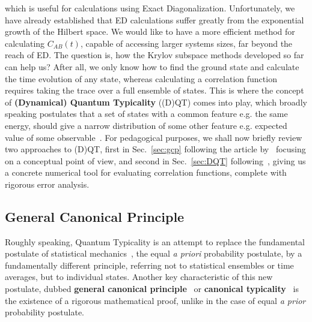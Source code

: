 which is useful for calculations using Exact Diagonalization. Unfortunately, we have already established that ED calculations
suffer greatly from the exponential growth of the Hilbert space.
We would like to have a more efficient method for calculating \(C_{AB}(t)\), capable of accessing larger systems
sizes, far beyond the reach of ED. The question is, how the Krylov subspace methods developed so far can help us?
After all, we only know how to find the ground state and calculate the time evolution of any state, whereas
calculating a correlation function requires taking the trace over a full ensemble of states. This is where the concept
of \textbf{(Dynamical) Quantum Typicality} ((D)QT) comes into play, which broadly speaking postulates that
a set of states with a common feature e.g. the same energy, should give a narrow distribution of some
other feature e.g. expected value of some observable~\autocite{Bartsch2009}. For pedagogical purposes, we shall
now briefly review two approaches to (D)QT, first in Sec.~\ref{sec:gcp} following the article by~\textcite{Popescu2006} focusing
on a conceptual point of view, and second in Sec.~\ref{sec:DQT} following~\textcite{Bartsch2009, Steinigeweg2014a}, giving us
a concrete numerical tool for evaluating correlation functions, complete with rigorous error analysis.

\subsection{\label{sec:gcp} General Canonical Principle}
Roughly speaking, Quantum Typicality is an attempt to replace the fundamental postulate of statistical mechanics~\autocite{Huang1987},
the equal \textit{a priori} probability postulate, by a fundamentally different principle, referring not to
statistical ensembles or time averages, but to individual states. Another key characteristic of
this new postulate, dubbed \textbf{general canonical principle}~\autocite{Popescu2006} or \textbf{canonical typicality}~\autocite{Goldstein2006}
is the existence of a rigorous mathematical proof, unlike in the case of equal
\textit{a prior} probability postulate. 

